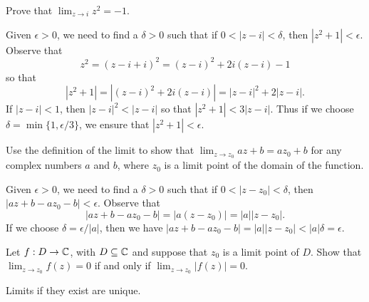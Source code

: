 \begin{example}
    Prove that \(\displaystyle\lim_{z \to i} z^2 = -1\).
    \begin{solution}
        Given \(\epsilon > 0\), we need to find a \(\delta > 0\) such that if \(0 < |z - i| < \delta\), then \(|z^2 + 1| < \epsilon\). Observe that
        \begin{equation*}
            z^2 = (z - i + i)^2 = (z - i)^2 + 2i(z - i) - 1
        \end{equation*}
        so that
        \begin{equation*}
            |z^2 + 1| = |(z - i)^2 + 2i(z - i)| = |z - i|^2 + 2|z - i|.
        \end{equation*}
        If \(|z - i| < 1\), then \(|z - i|^2 < |z - i|\) so that \(|z^2 + 1| < 3|z - i|\). Thus if we choose \(\delta = \min\{1, \epsilon/3\}\), we ensure that \(|z^2 + 1| < \epsilon\).
    \end{solution}
\end{example}

\begin{example}
    Use the definition of the limit to show that \(\lim_{z \to z_0} az + b = az_0 + b\) for any complex numbers \(a\) and \(b\), where \(z_0\) is a limit point of the domain of the function.

    \begin{solution}
        Given \(\epsilon > 0\), we need to find a \(\delta > 0\) such that if \(0 < |z - z_0| < \delta\), then \(|az + b - az_0 - b| < \epsilon\). Observe that
        \[
            |az + b - az_0 - b| = |a(z - z_0)| = |a||z - z_0|.
        \]
        If we choose \(\delta = \epsilon/|a|\), then we have \(|az + b - az_0 - b| = |a||z - z_0| < |a|\delta = \epsilon\).
    \end{solution}
\end{example}

\begin{example}
    Let \(f : D \to \mathbb{C}\), with \(D \subseteq \mathbb{C}\) and suppose that \(z_0\) is a limit point of \(D\). Show that \(\lim_{z \to z_0} f(z) = 0\) if and only if \(\lim_{z \to z_0} |f(z)| = 0\).
\end{example}

\begin{theorem}%
    Limits if they exist are unique.
    \label{thm:uniqueness-limits}
\end{theorem}


